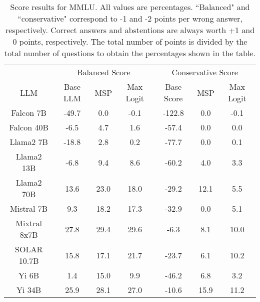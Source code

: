 \renewcommand\arraystretch{1.2}
\begin{table*}
\centering
\begin{tabular}{c|c|c|c|c|c|c}
& \multicolumn{3}{c|}{Balanced Score} & \multicolumn{3}{c}{Conservative Score} \\ 
LLM & Base LLM & MSP & Max Logit & Base Score & MSP & Max Logit\\ \hline
Falcon 7B & -49.7 & 0.0 & -0.1 & -122.8 & 0.0 & -0.1\\
Falcon 40B & -6.5 & 4.7 & 1.6 & -57.4 & 0.0 & 0.0\\
Llama2 7B & -18.8 & 2.8 & 0.2 & -77.7 & 0.0 & 0.1\\
Llama2 13B & -6.8 & 9.4 & 8.6 & -60.2 & 4.0 & 3.3\\
Llama2 70B & 13.6 & 23.0 & 18.0 & -29.2 & 12.1 & 5.5\\
Mistral 7B & 9.3 & 18.2 & 17.3 & -32.9 & 0.0 & 5.1\\
Mixtral 8x7B & 27.8 & 29.4 & 29.6 & -6.3 & 8.1 & 10.0\\
SOLAR 10.7B & 15.8 & 17.1 & 21.7 & -23.7 & 6.1 & 10.2\\
Yi 6B & 1.4 & 15.0 & 9.9 & -46.2 & 6.8 & 3.2\\
Yi 34B & 25.9 & 28.1 & 27.0 & -10.6 & 15.9 & 11.2\\
\hline
\end{tabular}
\caption{Score results for MMLU. All values are percentages. ``Balanced" and ``conservative" correspond to -1 and -2 points per wrong answer, respectively. Correct answers and abstentions are always worth +1 and 0 points, respectively. The total number of points is divided by the total number of questions to obtain the percentages shown in the table.}
\label{tab:mmlu_score}
\end{table*}
